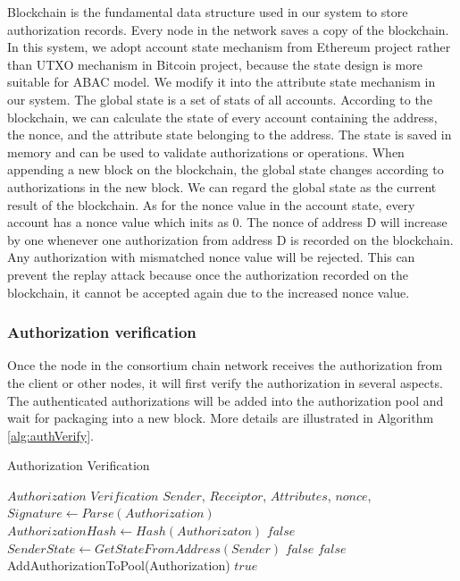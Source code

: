 Blockchain is the fundamental data structure used in our system to store authorization records. Every node in the network saves a copy of the blockchain. In this system, we adopt account state mechanism from Ethereum project rather than UTXO mechanism in Bitcoin project, because the state design is more suitable for ABAC model. We modify it into the attribute state mechanism in our system. The global state is a set of stats of all accounts. According to the blockchain, we can calculate the state of every account containing the address, the nonce, and the attribute state belonging to the address. The state is saved in memory and can be used to validate authorizations or operations. When appending a new block on the blockchain, the global state changes according to authorizations in the new block. We can regard the global state as the current result of the blockchain. As for the nonce value in the account state, every account has a nonce value which inits as 0. The nonce of address D will increase by one whenever one authorization from address D is recorded on the blockchain. Any authorization with mismatched nonce value will be rejected. This can prevent the replay attack because once the authorization recorded on the blockchain, it cannot be accepted again due to the increased nonce value.

\subsubsection{Authorization verification}
Once the node in the consortium chain network receives the authorization from the client or other nodes, it will first verify the authorization in several aspects. The authenticated authorizations will be added into the authorization pool and wait for packaging into a new block. More details are illustrated in Algorithm \ref{alg:authVerify}.

 \begin{algorithm}
 \caption{Authorization Verification}\label{alg:authVerify}
   \begin{algorithmic}[!htbp]
   \renewcommand{\algorithmicrequire}{\textbf{Input:}}
   \renewcommand{\algorithmicensure}{\textbf{Output:}}
   \REQUIRE $Authorization$
   \ENSURE  $Verification$
    \STATE $Sender$, $Receiptor$, $Attributes$, $nonce$, $Signature \gets Parse(Authorization)$
    \STATE $AuthorizationHash \gets Hash(Authorizaton)$
      \RETURN $false$
    \ENDIF
    \STATE $SenderState \gets GetStateFromAddress(Sender)$
      \RETURN $false$
    \ENDIF
        \RETURN $false$
      \ENDIF
    \ENDFOR
    \STATE AddAuthorizationToPool(Authorization)
   \RETURN $true$
   \end{algorithmic}
 \end{algorithm}

